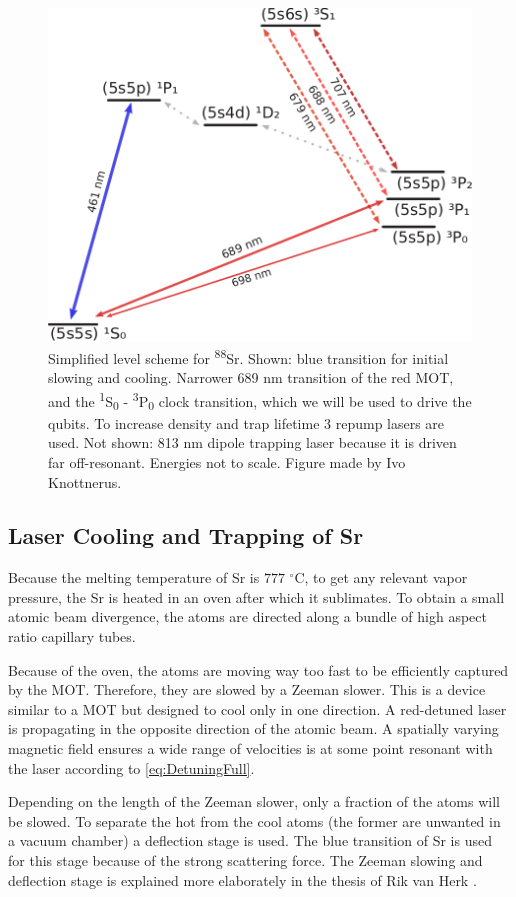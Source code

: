\begin{figure}
	\centering
	\includegraphics[width=0.55\linewidth]{figures/SrLevel.pdf}
	\caption{Simplified level scheme for \textsuperscript{88}Sr. Shown: blue transition for initial slowing and cooling. Narrower 689 nm transition of the red \ac{MOT}, and the \textsuperscript{1}S\textsubscript{0} - \textsuperscript{3}P\textsubscript{0} clock transition, which we will be used to drive the qubits. To increase density and trap lifetime 3 repump lasers are used. Not shown: 813 nm dipole trapping laser because it is driven far off-resonant. Energies not to scale. Figure made by Ivo Knottnerus.}
	\label{fig:SrLevel}
\end{figure}

\subsection{Laser Cooling and Trapping of Sr}

Because the melting temperature of Sr is $777$ ${}^{\circ}$C, to get any relevant vapor pressure, the Sr is heated in an oven after which it sublimates. To obtain a small atomic beam divergence, the atoms are directed along a bundle of high aspect ratio capillary tubes\cite{Stellmer2013}. 

Because of the oven, the atoms are moving way too fast to be efficiently captured by the MOT. Therefore, they are slowed by a Zeeman slower. This is a device similar to a MOT but designed to cool only in one direction. A red-detuned laser is propagating in the opposite direction of the atomic beam. A spatially varying magnetic field ensures a wide range of velocities is at some point resonant with the laser according to \cref{eq:DetuningFull}. 

Depending on the length of the Zeeman slower, only a fraction of the atoms will be slowed. To separate the hot from the cool atoms (the former are unwanted in a vacuum chamber) a deflection stage is used. The blue transition of Sr is used for this stage because of the strong scattering force. The Zeeman slowing and deflection stage is explained more elaborately in the thesis of Rik van Herk \cite{Herk2022}.

